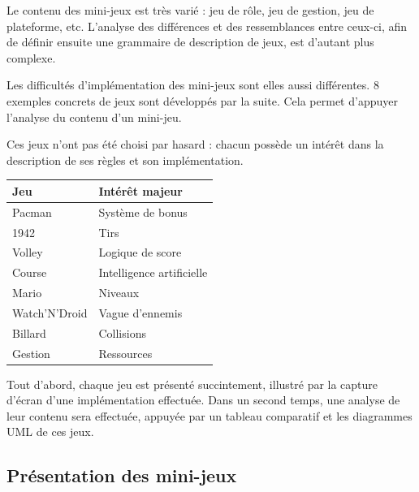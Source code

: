 
Le contenu des mini-jeux est très varié : jeu de rôle, jeu de gestion, jeu de plateforme, etc.
L'analyse des différences et des ressemblances entre ceux-ci, afin de définir ensuite une grammaire de description de jeux, est d'autant plus complexe.

Les difficultés d'implémentation des mini-jeux sont elles aussi différentes.
8 exemples concrets de jeux sont développés par la suite.
Cela permet d'appuyer l'analyse du contenu d'un mini-jeu.

Ces jeux n'ont pas été choisi par hasard : chacun possède un intérêt dans la description de ses règles et son implémentation. 


\begin{center}
\begin{tabular}{l|l}
 Jeu & Intérêt majeur \\
 \hline
 Pacman & Système de bonus \\
 1942 & Tirs \\
 Volley & Logique de score \\
 Course & Intelligence artificielle \\
 Mario & Niveaux \\
 Watch'N'Droid & Vague d'ennemis \\
 Billard & Collisions \\
 Gestion & Ressources \\
\end{tabular}
\end{center}

\vspace{0.5cm}

Tout d'abord, chaque jeu est présenté succintement, illustré par la capture d'écran d'une implémentation effectuée.
Dans un second temps, une analyse de leur contenu sera effectuée, appuyée par un tableau comparatif et les diagrammes UML de ces jeux.

\clearpage

\subsection{Présentation des mini-jeux}


